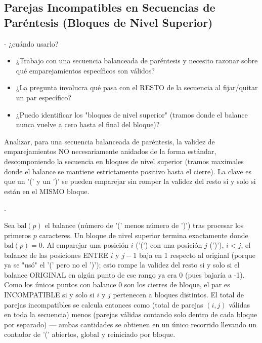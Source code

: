 \subsection{Parejas Incompatibles en Secuencias de Paréntesis (Bloques de Nivel Superior)}

 - ¿cuándo usarlo?

\begin{itemize}
\item ¿Trabajo con una secuencia balanceada de paréntesis y necesito razonar sobre qué emparejamientos específicos son válidos?
\item ¿La pregunta involucra qué pasa con el RESTO de la secuencia al fijar/quitar un par específico?
\item ¿Puedo identificar los "bloques de nivel superior" (tramos donde el balance nunca vuelve a cero hasta el final del bloque)?
\end{itemize}

 Analizar, para una secuencia balanceada de paréntesis, la validez de emparejamientos NO necesariamente anidados de la forma estándar, descomponiendo la secuencia en bloques de nivel superior (tramos maximales donde el balance se mantiene estrictamente positivo hasta el cierre). La clave es que un '(' y un ')' se pueden emparejar sin romper la validez del resto si y solo si están en el MISMO bloque.

 .

 Sea $\text{bal}(p)$ el balance (número de '(' menos número de ')') tras procesar los primeros $p$ caracteres. Un bloque de nivel superior termina exactamente donde $\text{bal}(p) = 0$. Al emparejar una posición $i$ ('(') con una posición $j$ (')'), $i<j$, el balance de las posiciones ENTRE $i$ y $j-1$ baja en 1 respecto al original (porque ya se "usó" el '(' pero no el ')'); esto rompe la validez del resto si y solo si el balance ORIGINAL en algún punto de ese rango ya era 0 (pues bajaría a -1). Como los únicos puntos con balance 0 son los cierres de bloque, el par es INCOMPATIBLE si y solo si $i$ y $j$ pertenecen a bloques distintos. El total de parejas incompatibles se calcula entonces como (total de parejas $(i,j)$ válidas en toda la secuencia) menos (parejas válidas contando solo dentro de cada bloque por separado) — ambas cantidades se obtienen en un único recorrido llevando un contador de '(' abiertos, global y reiniciado por bloque.


